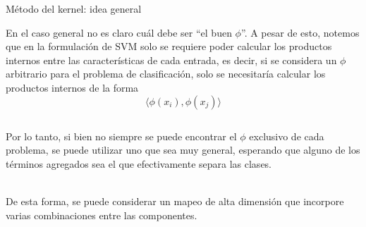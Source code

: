 \documentclass[9pt]{beamer}
\begin{document}
\begin{frame}{Método del kernel: idea general}

En el caso general no es claro cuál debe ser ``el buen $\phi$''. A pesar de esto, notemos que en la formulación de SVM solo se requiere poder calcular los productos internos entre las características de cada entrada, es decir, si se considera un $\phi$ arbitrario para el problema de clasificación, solo se necesitaría calcular los productos internos de la forma
\begin{equation*}
    \langle \phi(x_i) , \phi(x_j) \rangle
\end{equation*}
 \pause

\begin{columns}


\begin{column}{0.5\textwidth}
	Por lo tanto, si bien no siempre se puede encontrar el $\phi$ exclusivo de cada problema, se puede utilizar uno que sea muy general, esperando que alguno de los términos agregados sea el que efectivamente separa las clases.\\~\ \pause

De esta forma, se puede considerar un mapeo de alta dimensión que incorpore varias combinaciones entre las componentes.

\end{column}
	

\end{columns}
\end{frame}
\end{document}
